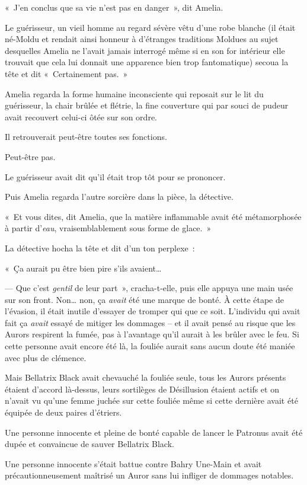 «~J'en conclus que sa vie n'est pas en danger~», dit Amelia.

Le guérisseur, un vieil homme au regard sévère vêtu d'une robe blanche (il était né-Moldu et rendait ainsi honneur à d'étranges traditions Moldues au sujet desquelles Amelia ne l'avait jamais interrogé même si en son for intérieur elle trouvait que cela lui donnait une apparence bien trop fantomatique) secoua la tête et dit «~Certainement pas.~»

Amelia regarda la forme humaine inconsciente qui reposait sur le lit du guérisseur, la chair brûlée et flétrie, la fine couverture qui par souci de pudeur avait recouvert celui-ci ôtée sur son ordre.

Il retrouverait peut-être toutes ses fonctions.

Peut-être pas.

Le guérisseur avait dit qu'il était trop tôt pour se prononcer.

Puis Amelia regarda l'autre sorcière dans la pièce, la détective.

«~Et vous dites, dit Amelia, que la matière inflammable avait été métamorphosée à partir d'\emph{eau}, vraisemblablement sous forme de glace.~»

La détective hocha la tête et dit d'un ton perplexe~:

«~Ça aurait pu être bien pire s'ils avaient…

--- Que c'est \emph{gentil} de leur part~», cracha-t-elle, puis elle appuya une main usée sur son front. Non… non, ça \emph{avait} été une marque de bonté. À cette étape de l'évasion, il était inutile d'essayer de tromper qui que ce soit. L'individu qui avait fait ça \emph{avait} essayé de mitiger les dommages -- et il avait pensé au risque que les Aurors respirent la fumée, pas à l'avantage qu'il aurait à les brûler avec le feu. Si cette personne avait encore été là, la fouliée aurait sans aucun doute été maniée avec plus de clémence.

Mais Bellatrix Black avait chevauché la fouliée seule, tous les Aurors présents étaient d'accord là-dessus, leurs sortilèges de Désillusion étaient actifs et on n'avait vu qu'une femme juchée sur cette fouliée même si cette dernière avait été équipée de deux paires d'étriers.

Une personne innocente et pleine de bonté capable de lancer le Patronus avait été dupée et convaincue de sauver Bellatrix Black.

Une personne innocente s'était battue contre Bahry Une-Main et avait précautionneusement maîtrisé un Auror sans lui infliger de dommages notables.


